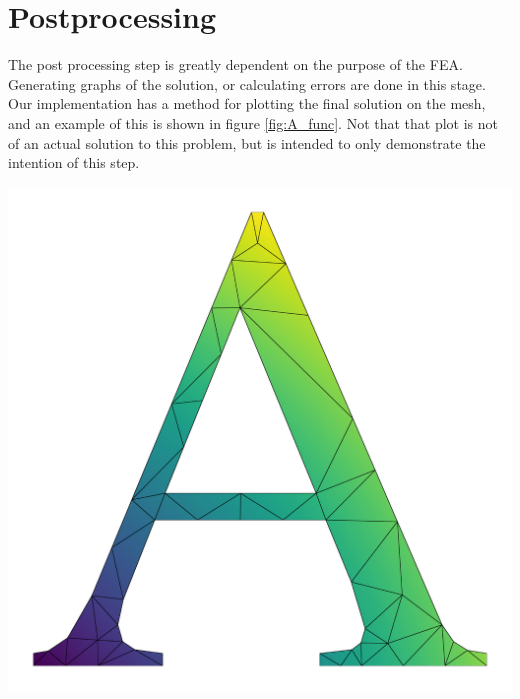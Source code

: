 \documentclass[../fem.tex]{subfiles}
\begin{document}
\section{Postprocessing}%
\label{sec:postprocessing}

The post processing step is greatly dependent on the purpose of the FEA.
Generating graphs of the solution, or calculating errors are done in this
stage. Our implementation has a method for plotting the final solution on the
mesh, and an example of this is shown in figure \ref{fig:A_func}. Not that that
plot is not of an actual solution to this problem, but is intended to only
demonstrate the intention of this step.

\begin{Figure}
   \begin{center}
     \includegraphics[width=0.8\linewidth]{a_func.png}
   \end{center}
   \label{fig:A_func}
\end{Figure}
\end{document}
